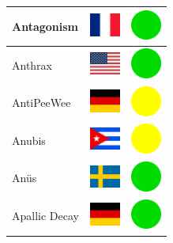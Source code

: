 \documentclass[12pt, a4paper, twoside]{report}
\begin{document}
\begin{center}
\begin{longtable}{|p{5cm}|p{2cm}|p{2cm}|}
 Antagonism                                                 & \includegraphics[width=1cm]{../img/flags/fr} &   \includegraphics[width=1cm]{../likes/y} \\ \hline
 Anthrax                                                    & \includegraphics[width=1cm]{../img/flags/us} &   \includegraphics[width=1cm]{../likes/y} \\ \hline
 AntiPeeWee                                                 & \includegraphics[width=1cm]{../img/flags/de} &   \includegraphics[width=1cm]{../likes/m} \\ \hline
 Anubis                                                     & \includegraphics[width=1cm]{../img/flags/cu} &   \includegraphics[width=1cm]{../likes/m} \\ \hline
 Anüs                                                       & \includegraphics[width=1cm]{../img/flags/se} &   \includegraphics[width=1cm]{../likes/y} \\ \hline
 Apallic Decay                                              & \includegraphics[width=1cm]{../img/flags/de} &   \includegraphics[width=1cm]{../likes/y} \\ \hline

\end{longtable}
\end{center}
\end{document}
